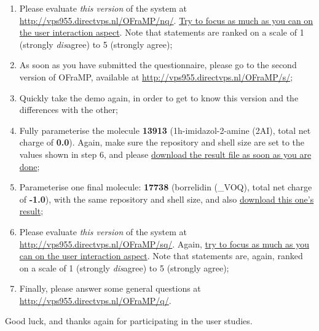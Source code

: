 \begin{enumerate}
\item Please evaluate \emph{this version} of the system at \url{http://vps955.directvps.nl/OFraMP/nq/}. \underline{Try to focus as much as you can on the user interaction aspect}. Note that statements are ranked on a scale of 1 (strongly \emph{dis}agree) to 5 (strongly agree);
\item As soon as you have submitted the questionnaire, please go to the second version of OFraMP, available at \url{http://vps955.directvps.nl/OFraMP/s/};
\item Quickly take the demo again, in order to get to know this version and the differences with the other;
\item Fully parameterise the molecule \textbf{13913} (1h-imidazol-2-amine (2AI), total net charge of \textbf{0.0}). Again, make sure the repository and shell size are set to the values shown in step 6, and please \underline{download the result file as soon as you are done};
\item Parameterise one final molecule: \textbf{17738} (borrelidin (\_VOQ), total net charge of \textbf{-1.0}), with the same repository and shell size, and also \underline{download this one's result};
\item Please evaluate \emph{this version} of the system at \url{http://vps955.directvps.nl/OFraMP/sq/}. Again, \underline{try to focus as much as you can on the user interaction aspect}. Note that statements are, again, ranked on a scale of 1 (strongly \emph{dis}agree) to 5 (strongly agree);
\item Finally, please answer some general questions at \url{http://vps955.directvps.nl/OFraMP/q/}.
\end{enumerate}
Good luck, and thanks again for participating in the user studies.
